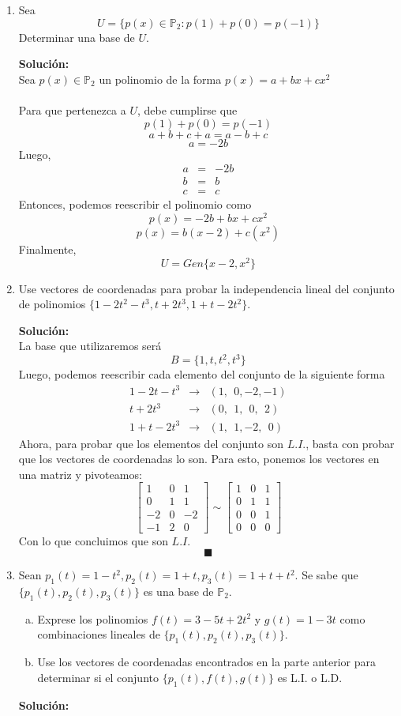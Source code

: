 \documentclass[12pt]{article}
\newenvironment{solucion}
{\begin{mdframed}[backgroundcolor=black!10]
		{\bf Solución:}\\
	}
	{
	\end{mdframed}
}
\newenvironment{preguntas}
{\begin{enumerate}\itemsep12pt
	}
	{
	\end{enumerate}
}
\newcommand{\ra}{\rightarrow}
\begin{document}
\begin{preguntas}
\item Sea 
	$$U=\{p(x) \in \mathbb{P}_2 : p(1) + p(0) = p(-1)\}$$
	Determinar una base de $U$.
\begin{solucion}
			Sea $p(x) \in \mathbb{P}_2$ un polinomio de la forma $p(x) = a + bx + cx^2$\\
			\\
			Para que pertenezca a $U$, debe cumplirse que
			$$p(1) + p(0) = p(-1)$$
			$$a+b+c+a=a-b+c$$
			$$a = -2b$$
			Luego,
			$$\begin{array}{rcl}
			a & = & -2b\\
			b & = & b\\
			c & = & c
			\end{array}$$
			Entonces, podemos reescribir el polinomio como
			$$p(x) = -2b + bx + cx^2$$
			$$p(x) = b(x-2) + c(x^2)$$
			Finalmente,
			$$U = Gen\{x-2, x^2\}$$
\end{solucion}
\item Use vectores de coordenadas para probar la independencia lineal del conjunto de polinomios $\{1-2t^2-t^3,t+2t^3,1+t-2t^2\}$.
\begin{solucion}
La base que utilizaremos será
		$$B = \{1,t,t^2,t^3\}$$
		Luego, podemos reescribir cada elemento del conjunto de la siguiente forma
		$$\begin{array}{lcl}
		1-2t-t^3 & \ra & (1,\ \ 0,-2,-1)\\
		t+2t^3 & \ra & (0,\ \ 1,\ \ 0,\ \ 2)\\
		1+t-2t^3 & \ra & (1,\ \ 1,-2,\ \ 0)
		\end{array}$$
		Ahora, para probar que los elementos del conjunto son $L.I.$, basta con probar que los vectores de coordenadas lo son. Para esto, ponemos los vectores en una matriz y pivoteamos:
		$$\begin{bmatrix}
		1 & 0 & 1\\
		0 & 1 & 1\\
		-2 & 0 & -2\\
		-1 & 2 & 0
		\end{bmatrix} \sim
		\begin{bmatrix}
		1 & 0 & 1\\
		0 & 1 & 1\\
		0 & 0 & 1\\
		0 & 0 & 0
		\end{bmatrix}$$
		Con lo que concluimos que son $L.I.$
		$$\blacksquare$$
\end{solucion}
\item Sean $p_1(t) = 1-t^2, p_2(t) = 1+t, p_3(t) = 1+t+t^2$. Se sabe que $\{p_1(t), p_2(t), p_3(t)\}$ es una base de $\mathbb{P}_2$.
\begin{enumerate}[a)]
\item Exprese los polinomios $f(t) = 3-5t + 2t^2$ y $g(t) = 1-3t$ como combinaciones lineales de $\{p_1(t), p_2(t), p_3(t)\}$.
\item Use los vectores de coordenadas encontrados en la parte anterior para determinar si el conjunto $\{p_1(t), f(t), g(t)\}$ es L.I. o L.D.
\end{enumerate}
\begin{solucion}


\end{solucion}
\end{preguntas}
\end{document}
